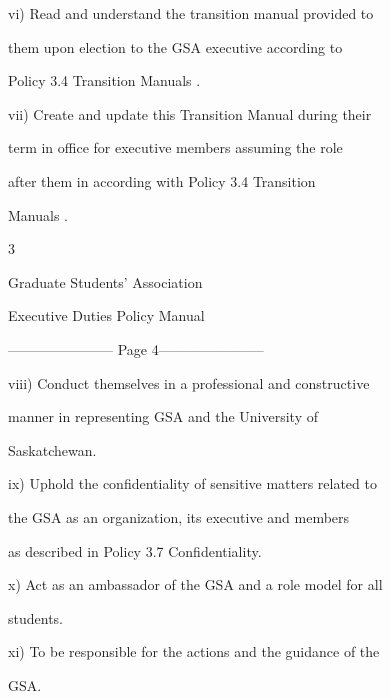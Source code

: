   

         vi)      Read  and  understand  the  transition  manual  provided  to  



                  them  upon  election  to  the  GSA  executive  according  to  



                  Policy 3.4 Transition Manuals .   

  

         vii)     Create  and  update  this  Transition  Manual  during  their  

                  term in office for executive  members  assuming the  role  

                  after   them   in   according   with   Policy   3.4   Transition  

                  Manuals .   

  



                                                  3  

                                      

                                    Graduate Students’ Association  

                                   Executive Duties Policy Manual  

  


----------------------- Page 4-----------------------

viii)    Conduct  themselves  in  a  professional  and  constructive  

         manner   in   representing   GSA   and   the   University   of  

         Saskatchewan.   

  

ix)      Uphold the confidentiality of sensitive matters related to  

         the GSA  as an organization, its  executive  and  members  

         as described in Policy 3.7 Confidentiality.   

  

x)       Act as an ambassador of the GSA and a role model for all  

         students.   

  

xi)      To be responsible for the actions and the guidance of the  

         GSA.   

